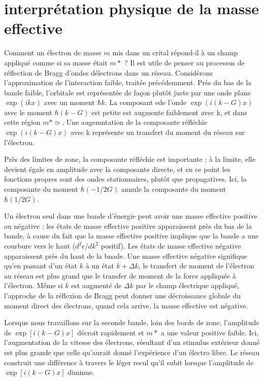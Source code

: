 \section{interprétation physique de la masse effective}
Comment un électron de masse $m$ mis dans un crital répond-il à un champ appliqué
comme si sa masse était $m*$ ? Il est utile de penser au processus de réflection
de Bragg d'ondes délectrons dans un réseau. Considérons l'approximation de
l'interaction faible, traitée précédemment. Près du bas de la bande faible,
l'orbitale est représentée de façon plutôt juste par une onde plane $\exp(ikx)$
avec un moment $\hbar k$. La composant ede l'onde $\exp(i(k-G)x)$ avec le moment
$\hbar(k-G)$ est petite est augmente faiblement avec k, et dans cette région
$m*\simeq$. Une augemntation de la composante réfléchie $\exp(i(k-G)x)$ avec k
représente un transfert du moment du réseau sur l'électron.

Près des limites de zone, la composante réfléchie est importante ; à la limite,
elle devient égale en amplitude avec la composante directe, et en ce point les
fonctions propres sont des ondes stationnaires, plutôt que propagatives. Ici, la
composante du moment $\hbar(-1/2 G)$ annule la composante du moment $\hbar(1/2
G)$.

Un électron seul dans une bande d'énergie peut avoir une masse effective positive
ou négative : les états de masse effective positive apparaissent près du bas de
la bande, à cause du fait que la masse effective positive implique que la bande a
une courbure vers le haut ($d^2\epsilon/dk^2$ positif). Les états de masse
effective négative apparaissent près du haut de la bnade. Une masse effective
négative signifique qu'en passant d'un état $k$ à un état $k+\Delta k$, le
transfert de moment de l'électron au réseau est plus grand que le transfer de
moment de la force appliquée à l'électron. Même si $k$ est augmenté de $\Delta k
$ par le champ électrique appliqué, l'approche de la réflexion de Bragg peut
donner une décroissance globale du moment direct des électrons, quand cela
arrive, la masse effective est négative.

Lorsque nous travaillons sur la seconde bande, loin des bords de zone,
l'amplitude de $\exp[i(k-G)x]$ décroit rapidement et $m*$ a une valeur positive
faible. Ici, l'augmentation de la vitesse des électrons, résultant d'un stimulus
extérieur donné est plus grande que celle qu'aurait donné l'expérience d'un
électro libre. Le réseau construit une différence à travers le léger recul qu'il
subit lorsque l'amplitude de $\exp[i(k-G)x]$ diminue.

